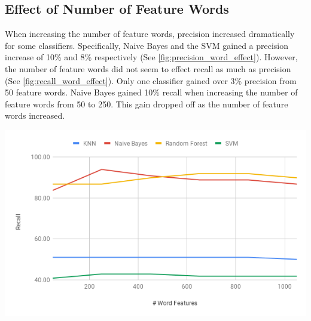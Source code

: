 \documentclass[12pt]{article}
\newenvironment{Figure}
  {\par\medskip\noindent\minipage{\linewidth}}
  {\endminipage\par\medskip}
\begin{document}
\begin{multicols}{2}
            \subsection{Effect of Number of Feature Words} 
                When increasing the number of feature words, precision increased dramatically for some classifiers. 
                Specifically, Naive Bayes and the SVM gained a precision increase of 10\% and 8\% respectively (See \autoref{fig:precision_word_effect}).
                However, the number of feature words did not seem to effect recall as much as precision (See \autoref{fig:recall_word_effect}).
                Only one classifier gained over 3\% precision from 50 feature words. Naive Bayes gained 10\% recall when increasing 
                the number of feature words from 50 to 250. This gain dropped off as the number of feature words increased.

                \begin{Figure}
                    \centering
                    \includegraphics[width=\linewidth]{figures/recall_wv_effect.png}
                    \label{fig:recall_word_effect}
                \end{Figure}
                

\end{multicols}
\end{document}
